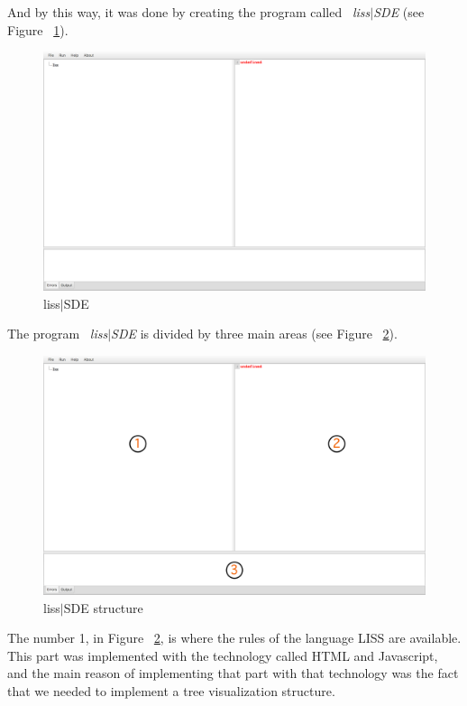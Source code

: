 \documentclass[
  oneside,
  11pt, a4paper,
  footinclude=true,
  headinclude=true,
  cleardoublepage=empty
]{scrbook}
\begin{document}
And by this way, it was done by creating the program called ~\textit{liss$|$SDE} (see Figure ~\ref{fig:LISS-SDE}).

\begin{figure}[h!]
  \centering
    \includegraphics[width=1\textwidth]{img/LISS-SDE.png}
    \caption{liss$|$SDE}
    \label{fig:LISS-SDE}
\end{figure}

The program ~\textit{liss$|$SDE} is divided by three main areas (see Figure ~\ref{fig:LISS-SDE_structure}).

\begin{figure}[h!]
  \centering
    \includegraphics[width=1\textwidth]{img/LISS-SDE_organization.png}
    \caption{liss$|$SDE structure}
    \label{fig:LISS-SDE_structure}
\end{figure}

The number 1, in Figure ~\ref{fig:LISS-SDE_structure}, is where the rules of the language LISS are available. This part was implemented with the technology called HTML and Javascript, and the main reason of implementing that part with that technology was the fact that we needed to implement a tree visualization structure. 
\end{document}
